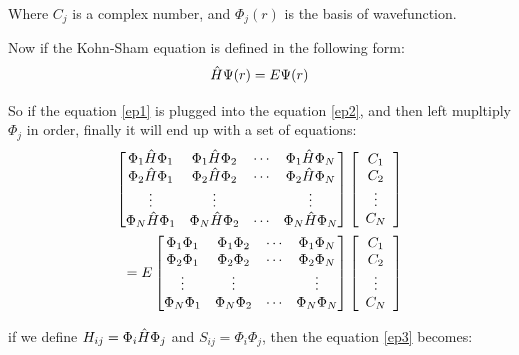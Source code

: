 \documentclass[a4paper]{report}
\begin{document}
\noindent Where $C_j$ is a complex number, and $\Phi_j (r)$ is the basis of wavefunction. 

\noindent Now if the Kohn-Sham equation is defined in the following form:
\begin{equation}\label{ep2}
 \hat{H} \Psi (r) = E \Psi (r)
\end{equation}
 
\noindent So if the equation \ref{ep1} is plugged into the equation \ref{ep2}, and then left mupltiply $\Phi_j$ in order, finally it will end up with a set of equations:
\begin{equation}\begin{split}\label{ep3}
\left[
\begin{matrix}
    \Phi_1 \hat{H} \Phi_1 & \Phi_1 \hat{H} \Phi_2 & \cdots & \Phi_1 \hat{H} \Phi_N \\
    \Phi_2 \hat{H} \Phi_1 & \Phi_2 \hat{H} \Phi_2 & \cdots & \Phi_2 \hat{H} \Phi_N \\
    \vdots               & \vdots               &        & \vdots               \\
    \Phi_N \hat{H} \Phi_1 & \Phi_N \hat{H} \Phi_2 & \cdots & \Phi_N \hat{H} \Phi_N \\
\end{matrix} \right] \left[ \begin{array}{c} C_1 \\ C_2 \\ \vdots \\ C_N\end{array} \right] \\
=E \left[
\begin{matrix}
    \Phi_1 \Phi_1 & \Phi_1 \Phi_2 & \cdots & \Phi_1 \Phi_N \\
   \Phi_2 \Phi_1 & \Phi_2 \Phi_2 & \cdots & \Phi_2 \Phi_N \\
    \vdots               & \vdots               &        & \vdots               \\
   \Phi_N \Phi_1 & \Phi_N \Phi_2 & \cdots & \Phi_N \Phi_N \\
\end{matrix} \right]\left[ \begin{array}{c} C_1 \\ C_2 \\ \vdots \\ C_N\end{array} \right]
\end{split}\end{equation}

\noindent if we define $H_{ij} = \Phi_i \hat{H} \Phi_j$ and $S_{ij} = \Phi_i \Phi_j$, then the equation \ref{ep3} becomes:
\end{document}
